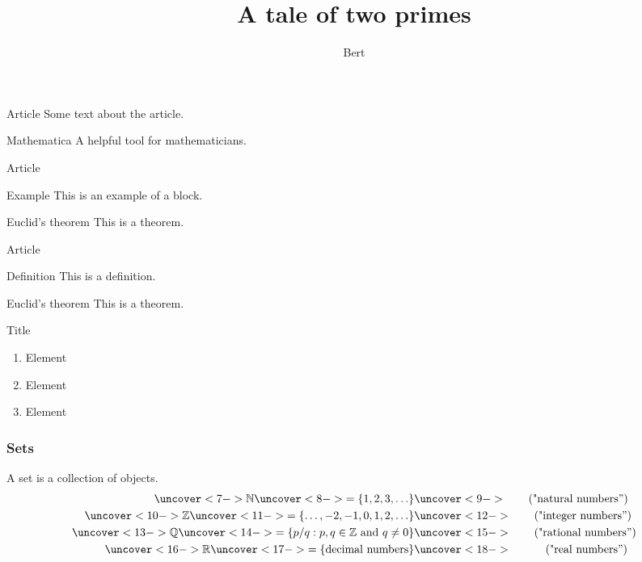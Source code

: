 \documentclass{beamer}
\author{Bert}
\title{A tale of two primes}
\begin{document}
\begin{frame}
\titlepage
\end{frame}
\begin{frame}{Article}
Some text about the article.
\end{frame}
\begin{frame}{Mathematica}
A helpful tool for mathematicians.
\end{frame}

\begin{frame}{Article}
\begin{block}{Example}
This is an example of a block.
\end{block}
\begin{block}{Euclid's theorem}
This is a theorem.
\end{block}
\end{frame}

\begin{frame}{Article}
\begin{block}{Definition}
This is a definition.
\end{block}
\pause
\begin{block}{Euclid's theorem}
This is a theorem.
\end{block}
\end{frame}

\begin{frame}{Title}
\begin{enumerate}
\item Element
\pause
\item Element
\pause
\item Element
\end{enumerate}
\end{frame}

\begin{frame}
\frametitle{Sets}
A \alert{set} is a collection of objects.
\[
\begin{split}
\uncover<7->{\mathbb{N}} \uncover<8->{= \{1,2,3,\ldots\}}&\uncover<9->{ \qquad (\text{"natural numbers''})} \\
\uncover<10->{\mathbb{Z}} \uncover<11->{=\{\ldots,-2,-1,0,1,2,\ldots\}}&\uncover<12->{ \qquad(\text{"integer numbers''})} \\
\uncover<13->{\mathbb{Q}} \uncover<14->{= \{p/q : p,q\in\mathbb{Z} \text{ and } q\neq 0\}}&\uncover<15->{\qquad (\text{"rational numbers''})} \\
\uncover<16->{\mathbb{R}} \uncover<17->{= \{\hbox{decimal numbers}\}}&\uncover<18->{\quad\qquad (\text{"real numbers''})}
\end{split}
\]
\end{frame}
\end{document}
